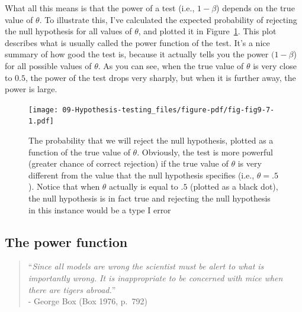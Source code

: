 \documentclass[
  a4paper,
]{book}
\begin{document}
What all this means is that the power of a test (i.e., \(1 - \beta\))
depends on the true value of \(\theta\). To illustrate this, I've
calculated the expected probability of rejecting the null hypothesis for
all values of \(\theta\), and plotted it in Figure~\ref{fig-fig9-7}.
This plot describes what is usually called the power function of the
test. It's a nice summary of how good the test is, because it actually
tells you the power \((1 - \beta\)) for all possible values of
\(\theta\). As you can see, when the true value of \(\theta\) is very
close to \(0.5\), the power of the test drops very sharply, but when it
is further away, the power is large.

\begin{figure}

\texttt{[image: 09-Hypothesis-testing\_files/figure-pdf/fig-fig9-7-1.pdf]} \hfill{}

\caption{\label{fig-fig9-7}The probability that we will reject the null
hypothesis, plotted as a function of the true value of \(\theta\).
Obviously, the test is more powerful (greater chance of correct
rejection) if the true value of \(\theta\) is very different from the
value that the null hypothesis specifies (i.e., \(\theta = .5\) ).
Notice that when \(\theta\) actually is equal to \(.5\) (plotted as a
black dot), the null hypothesis is in fact true and rejecting the null
hypothesis in this instance would be a type I error}

\end{figure}

\hypertarget{the-power-function-1}{%
\subsection{The power function}\label{the-power-function-1}}

\begin{quote}
``\emph{Since all models are wrong the scientist must be alert to what
is importantly wrong. It is inappropriate to be concerned with mice when
there are tigers abroad.}''\\
- George Box (Box 1976, p.~792)
\end{quote}
\end{document}
